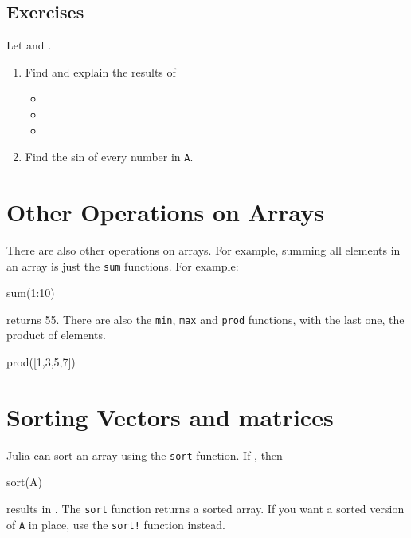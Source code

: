 \subsection{Exercises}

Let  and . 
\begin{enumerate}
\item  Find and explain the results of
%
\begin{itemize}
\item {}
\item {}
\item {} 
\end{itemize}


\item Find the sin of every number in \texttt{A}.
\end{enumerate}


\section{Other Operations on Arrays}

There are also other operations on arrays. For example, summing all
elements in an array is just the \texttt{sum} functions. For example:

\begin{jlblock}[array]
sum(1:10)
\end{jlblock}
%
returns 55. There are also the \texttt{min}, \texttt{max} and
\texttt{prod} functions, with the last one, the product of elements.

\begin{jlblock}[array]
prod([1,3,5,7])
\end{jlblock}
%


\section{Sorting Vectors and matrices}

Julia can sort an array using the \texttt{sort} function. If , then 
\begin{jlblock}[array]
sort(A)
\end{jlblock}
%
results in  \printpythontex[verb].  The \texttt{sort} function returns a sorted array.  If you want a sorted version of \verb!A! in place, use the \verb|sort!| function instead. 

